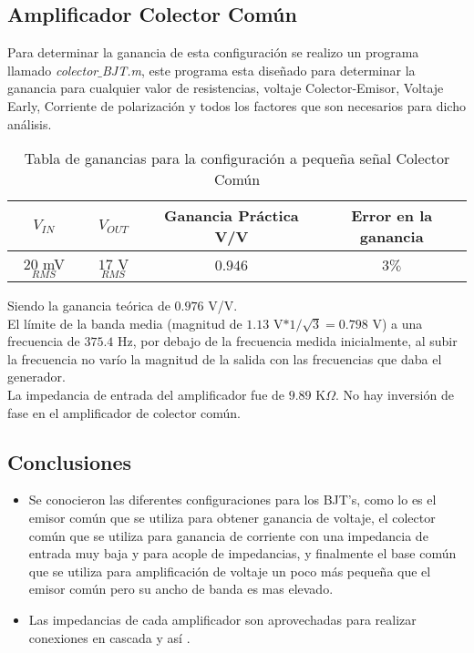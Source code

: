 \documentclass[11pt,graphicx,caption,rotating]{article}
\begin{document}
\subsection{Amplificador Colector Común}
Para determinar la ganancia de esta configuración se realizo un programa llamado \textit{colector$\_$BJT.m}, este programa esta diseñado para determinar la ganancia para cualquier valor de resistencias, voltaje Colector-Emisor, Voltaje Early, Corriente de polarización y todos los factores que son necesarios para dicho análisis.
\begin{table}[H]
	\centering
\begin{tabular}[c]{|c|c|c|c|} \hline
$V_{IN}$ & $V_{OUT}$ & \textbf{Ganancia Práctica V/V} & \textbf{Error en la ganancia} \\ \hline
$20$ mV$_{RMS}$ & $17$ V$_{RMS}$ & $0.946$ & $3\%$ \\ \hline
\end{tabular}
	\caption{Tabla de ganancias para la configuración a pequeña señal Colector Común}
	\label{tab6}
\end{table}
\noindent
Siendo la ganancia teórica de $0.976$ V/V.\\
El límite de la banda media (magnitud de $1.13$ V$*1/ \sqrt{3}=0.798$ V)  a una frecuencia de $375.4$ Hz, por debajo de la frecuencia medida inicialmente, al subir la frecuencia no varío la magnitud de la salida con las frecuencias que daba el generador.\\
La impedancia de entrada del amplificador fue de $9.89$ K$\Omega$. No hay inversión de fase en el amplificador de colector común.

\subsection{Conclusiones}
\begin{itemize}
 \item Se conocieron las diferentes configuraciones para los BJT's, como lo es el emisor común que se utiliza para obtener ganancia de voltaje, el colector común que se utiliza para ganancia de corriente con una impedancia de entrada muy baja y para acople de impedancias, y finalmente el base común que se utiliza para amplificación de voltaje un poco más pequeña que el emisor común pero su ancho de banda es mas elevado.
 \item Las impedancias de cada amplificador son aprovechadas para realizar conexiones en cascada y así .
\end{itemize}
\end{document}
